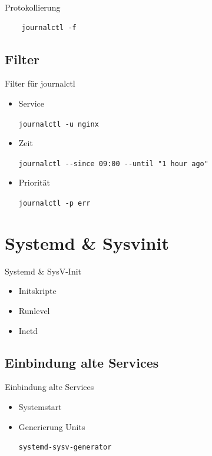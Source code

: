 \begin{frame}[fragile]{Protokollierung}
  \begin{lstlisting}
    journalctl -f
    \end{lstlisting}
\end{frame}
  
\subsection{Filter}

\begin{frame}[fragile]{Filter für journalctl}
  \begin{itemize}
  \item Service

	  \verb|journalctl -u nginx|
  \item Zeit

	  \verb|journalctl --since 09:00 --until "1 hour ago"|
  \item Priorität

	  \verb|journalctl -p err|
  \end{itemize}
\end{frame}

\section{Systemd \& Sysvinit}

\begin{frame}{Systemd \& SysV-Init}
  \begin{itemize}
  \item Initskripte
  \item Runlevel
  \item Inetd
  \end{itemize}
\end{frame}

\subsection{Einbindung alte Services}

\begin{frame}[fragile]{Einbindung alte Services}
  \begin{itemize}
    \item Systemstart
    \item Generierung Units

	    \verb|systemd-sysv-generator|
  \end{itemize}
\end{frame}

